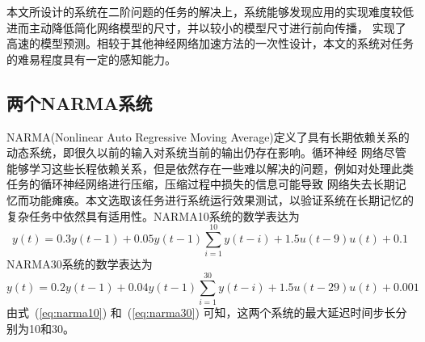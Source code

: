 本文所设计的系统在二阶问题的任务的解决上，系统能够发现应用的实现难度较低进而主动降低简化网络模型的尺寸，并以较小的模型尺寸进行前向传播，
实现了高速的模型预测。相较于其他神经网络加速方法的一次性设计，本文的系统对任务的难易程度具有一定的感知能力。

\subsection{两个NARMA系统}

NARMA(Nonlinear Auto Regressive Moving Average)定义了具有长期依赖关系的动态系统，即很久以前的输入对系统当前的输出仍存在影响。循环神经
网络尽管能够学习这些长程依赖关系，但是依然存在一些难以解决的问题，例如对处理此类任务的循环神经网络进行压缩，压缩过程中损失的信息可能导致
网络失去长期记忆而功能瘫痪。本文选取该任务进行系统运行效果测试，以验证系统在长期记忆的复杂任务中依然具有适用性。NARMA10系统的数学表达为
\begin{equation}
	y(t) = 0.3y(t-1) + 0.05y(t-1)\sum_{i=1}^{10}y(t-i) + 1.5u(t-9)u(t) + 0.1
\label{eq:narma10}
\end{equation}
NARMA30系统的数学表达为
\begin{equation}
	y(t) = 0.2y(t-1) + 0.04y(t-1)\sum_{i=1}^{30}y(t-i) + 1.5u(t-29)u(t) + 0.001
\label{eq:narma30}
\end{equation}
由式~(\ref{eq:narma10}) 和~(\ref{eq:narma30}) 可知，这两个系统的最大延迟时间步长分别为10和30。
